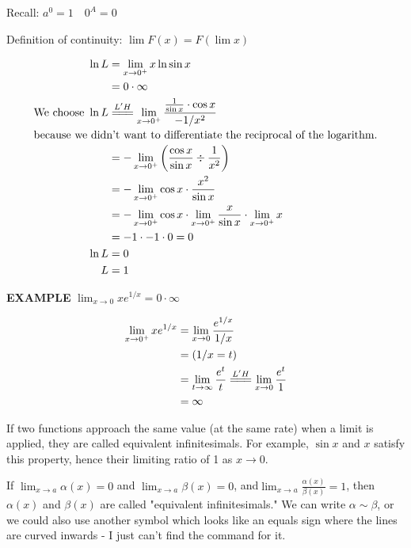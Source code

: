 \documentclass{article}
\begin{document}
\vspace{10pt}

Recall: $a^0=1\quad0^A=0$

\vspace{10pt}

Definition of continuity: $\lim F(x)=F(\lim x)$

\begin{align*}
\ln L&=\lim_{x\to0^+}x\ln\sin x\\
&=0\cdot\infty\\
\mbox{We choose }\ln L&\overset{L'H}{=\joinrel=\joinrel=}\lim_{x\to0^+}\frac{\frac{1}{\sin x}\cdot\cos x}{-1/x^2}\\
\multicolumn{2}{l}{\mbox{because we didn't want to differentiate the reciprocal of the logarithm.}}\\
&=-\lim_{x\to0^+}\left(\frac{\cos x}{\sin x}\div\frac{1}{x^2}\right)\\
&=-\lim_{x\to0^+}\cos x\cdot\frac{x^2}{\sin x}\\
&=-\lim_{x\to0^+}\cos x\cdot\lim_{x\to0^+}\frac{x}{\sin x}\cdot\lim_{x\to0^+}x\\
&=-1\cdot-1\cdot0=0\\
\ln L&=0\\
L&=1
\end{align*}

\newpage

{\bf{}EXAMPLE} $\displaystyle\lim_{x\to0}xe^{1/x}=0\cdot\infty$

\begin{align*}
\lim_{x\to0^+}xe^{1/x}&=\lim_{x\to0}\frac{e^{1/x}}{1/x}\\
&=(1/x=t)\\
&=\lim_{t\to\infty}\frac{e^t}{t}\overset{L'H}{=\joinrel=\joinrel=}\lim_{x\to0}\frac{e^t}{1}\\
&=\infty
\end{align*}

\vspace{10pt}

If two functions approach the same value (at the same rate) when a limit is applied, they are called equivalent infinitesimals. For example, $\sin x$ and $x$ satisfy this property, hence their limiting ratio of 1 as $x\to0$.

\vspace{10pt}

If $\lim_{x\to a}\alpha(x)=0$ and $\lim_{x\to a}\beta(x)=0$, and$\lim_{x\to a}\frac{\alpha(x)}{\beta(x)}=1$, then $\alpha(x)$ and $\beta(x)$ are called "equivalent infinitesimals."  We can write $\alpha\sim\beta$, or we could also use another symbol which looks like an equals sign where the lines are curved inwards - I just can't find the command for it.
\end{document}
